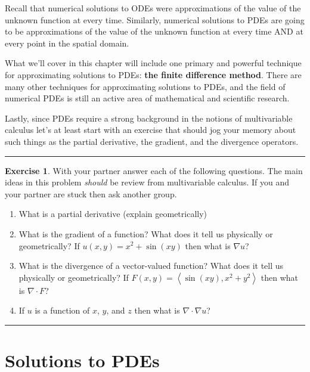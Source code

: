 \documentclass[
]{book}
\providecommand{\tightlist}{%
  \setlength{\itemsep}{0pt}\setlength{\parskip}{0pt}}
\theoremstyle{definition}
\theoremstyle{definition}
\theoremstyle{definition}
\newtheorem{exercise}{Exercise}[chapter]
\theoremstyle{remark}
\begin{document}
Recall that numerical solutions to ODEs were approximations of the value of the unknown function at every time. Similarly, numerical solutions to PDEs are going to be approximations of the value of the unknown function at every time AND at every point in the spatial domain.

What we'll cover in this chapter will include one primary and powerful technique for approximating solutions to PDEs: \textbf{the finite difference method}. There are many other techniques for approximating solutions to PDEs, and the field of numerical PDEs is still an active area of mathematical and scientific research.

Lastly, since PDEs require a strong background in the notions of multivariable calculus let's at least start with an exercise that should jog your memory about such things as the partial derivative, the gradient, and the divergence operators.

\begin{center}\rule{0.5\linewidth}{0.5pt}\end{center}

\begin{exercise}
\protect\hypertarget{exr:unnamed-chunk-509}{}{\label{exr:unnamed-chunk-509} }With your partner answer each of the following questions. The main ideas in this problem \emph{should} be review from multivariable calculus. If you and your partner are stuck then ask another group.

\begin{enumerate}
\def\labelenumi{\alph{enumi}.}
\tightlist
\item
  What is a partial derivative (explain geometrically)
\item
  What is the gradient of a function? What does it tell us physically or geometrically? If \(u(x,y)=x^2+\sin(xy)\) then what is \(\nabla u\)?
\item
  What is the divergence of a vector-valued function? What does it tell us physically or geometrically? If \(F(x,y)=\left< \sin(xy), x^2+y^2\right>\) then what is \(\nabla \cdot F\)?
\item
  If \(u\) is a function of \(x\), \(y\), and \(z\) then what is \(\nabla \cdot \nabla u\)?
\end{enumerate}
\end{exercise}

\begin{center}\rule{0.5\linewidth}{0.5pt}\end{center}

\hypertarget{solutions-to-pdes}{%
\section{Solutions to PDEs}\label{solutions-to-pdes}}
\end{document}
